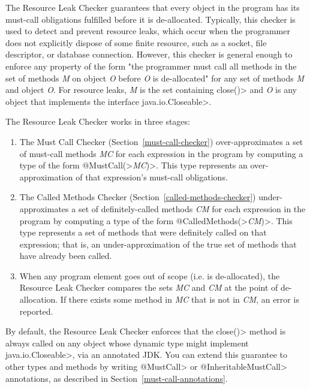 \htmlhr
{}

The Resource Leak Checker guarantees that every object in the program
has its must-call obligations fulfilled before it is de-allocated.
Typically, this checker is used to detect and prevent resource leaks,
which occur when the programmer does not explicitly dispose of some finite resource,
such as a socket, file descriptor, or database connection. However, this checker
is general enough to enforce any property of the form "the programmer must call
all methods in the set of methods \emph{M} on object \emph{O} before \emph{O}
is de-allocated" for any set of methods \emph{M} and object \emph{O}.
For resource leaks, \emph{M} is the set containing \<close()> and \emph{O}
is any object that implements the interface \<java.io.Closeable>.

The Resource Leak Checker works in three stages:
\begin{enumerate}
\item The Must Call Checker (Section~\ref{must-call-checker})
over-approximates a set of must-call methods \emph{MC} for each expression
in the program by computing a type of the form \<@MustCall(>\emph{MC}\<)>.
This type represents an over-approximation of that expression's must-call obligations.
\item The Called Methods Checker (Section~\ref{called-methods-checker})
under-approximates a set of definitely-called methods \emph{CM} for each expression
in the program by computing a type of the form \<@CalledMethods(>\emph{CM}\<)>.
This type represents a set of methods that were definitely called on that expression;
that is, an under-approximation of the true set of methods that have already been called.
\item When any program element goes out of scope (i.e. is de-allocated), the Resource
Leak Checker compares the sets \emph{MC} and \emph{CM} at the point of de-allocation.
If there exists some method in \emph{MC} that is not in \emph{CM}, an error is reported.
\end{enumerate}

By default, the Resource Leak Checker enforces that the \<close()> method is always
called on any object whose dynamic type might implement \<java.io.Closeable>, via an annotated
JDK. You can extend this guarantee to other types and methods by writing
\<@MustCall> or \<@InheritableMustCall> annotations, as described in
Section~\ref{must-call-annotations}.

